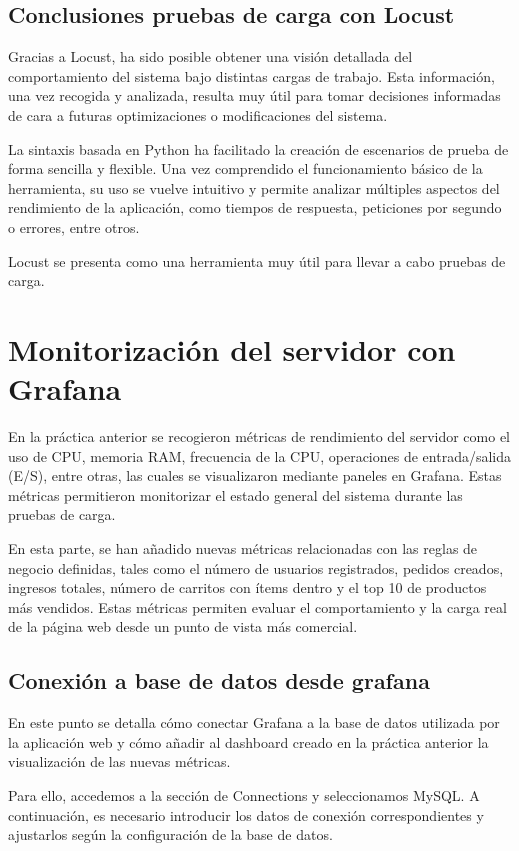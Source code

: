 \documentclass[10pt]{book}
\begin{document}
\section{Conclusiones pruebas de carga con Locust}
Gracias a Locust, ha sido posible obtener una visión detallada del comportamiento del sistema bajo distintas cargas de trabajo. Esta información, una vez recogida y analizada, resulta muy útil para tomar decisiones informadas de cara a futuras optimizaciones o modificaciones del sistema.

La sintaxis basada en Python ha facilitado la creación de escenarios de prueba de forma sencilla y flexible. Una vez comprendido el funcionamiento básico de la herramienta, su uso se vuelve intuitivo y permite analizar múltiples aspectos del rendimiento de la aplicación, como tiempos de respuesta, peticiones por segundo o errores, entre otros.

Locust se presenta como una herramienta muy útil para llevar a cabo pruebas de carga.


\chapter{Monitorización del servidor con Grafana}
En la práctica anterior se recogieron métricas de rendimiento del servidor como el uso de CPU, memoria RAM, frecuencia de la CPU, operaciones de entrada/salida (E/S), entre otras, las cuales se visualizaron mediante paneles en Grafana. Estas métricas permitieron monitorizar el estado general del sistema durante las pruebas de carga.

En esta parte, se han añadido nuevas métricas relacionadas con las reglas de negocio definidas, tales como el número de usuarios registrados, pedidos creados, ingresos totales, número de carritos con ítems dentro y el top 10 de productos más vendidos. Estas métricas permiten evaluar el comportamiento y la carga real de la página web desde un punto de vista más comercial.

\section{Conexión a base de datos desde grafana}
En este punto se detalla cómo conectar Grafana a la base de datos utilizada por la aplicación web y cómo añadir al dashboard creado en la práctica anterior la visualización de las nuevas métricas.

Para ello, accedemos a la sección de Connections y seleccionamos MySQL. A continuación, es necesario introducir los datos de conexión correspondientes y ajustarlos según la configuración de la base de datos.
\end{document}
